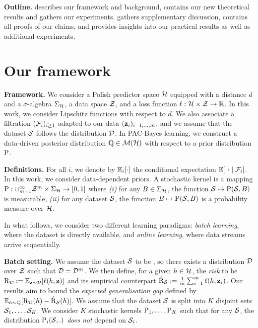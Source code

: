 \textbf{Outline.}  describes our framework and background,  contains our new theoretical results and  gathers our experiments. 
 gathers supplementary discussion,  contains all proofs of our claims, and  provides insights into our practical results as well as additional experiments.

\section{Our framework}
\label{sec:framework}

\textbf{Framework.} 
We consider a Polish predictor space $\H$ equipped with a distance $d$ and a $\sigma$-algebra $\Sigma_{\Hcal}$, a data space $\Z$, and a loss function $\loss : \H\times \Z \rightarrow \R$.
In this work, we consider Lipschitz functions with respect to $d$.
We also associate a filtration $(\Fcal_{i})_{i\geq 1}$ adapted to our data $(\z_i)_{i=1,\dots,m}$, and we assume that the dataset $\S$ follows the distribution $\Dcal$.
In PAC-Bayes learning, we construct a data-driven posterior distribution $\Q\in\Mcal(\H)$ with respect to a prior distribution $\P$. 

\textbf{Definitions.} 
For all $i$, we denote by $\EE_{i}[\cdot]$ the conditional expectation $\EE[\ \cdot\mid \Fcal_i]$.
In this work, we consider data-dependent priors.
A stochastic kernel is a mapping $\P: \cup_{m=1}^\infty\Z^m\times \Sigma_{\Hcal} \rightarrow [0,1]$ where {\it (i)} for any $B\in \Sigma_{\Hcal}$, the function  $\S\mapsto \P(\S,B)$ is measurable, {\it (ii)} for any dataset $\S$, the function $B\mapsto \P(\S,B)$ is a probability measure over $\H$.

In what follows, we consider two different learning paradigms: \emph{batch learning}, where the dataset is directly available, and \emph{online learning}, where data streams arrive sequentially.

\textbf{Batch setting.} 
We assume the dataset $\S$ to be \iid, so there exists a distribution $\D$ over $\Z$ such that $\Dcal=\D^m$.
We then define, for a given $h\in\H$, the \emph{risk} to be $\Risk_\D\defeq\EE_{\z\sim \D}[\loss(h,\z)]$ and its empirical counterpart $\Riskhat_{\S} \defeq \frac{1}{m}\sum_{i=1}^m \loss(h,\z_i)$. 
Our results aim to bound the \emph{expected generalisation gap} defined by $\EE_{h\sim\Q}[ \Risk_{\D}(h) - \Riskhat_{\S}(h)]$.
We assume that the dataset $\S$ is split into $K$ disjoint sets $\S_1,\dots,\S_K$.
We consider $K$ stochastic kernels  $\P_1,\dots,\P_K$ such that for any $\S$, the distribution $\P_{i}(\S,.)$ {\it does not} depend on $\S_i$.

